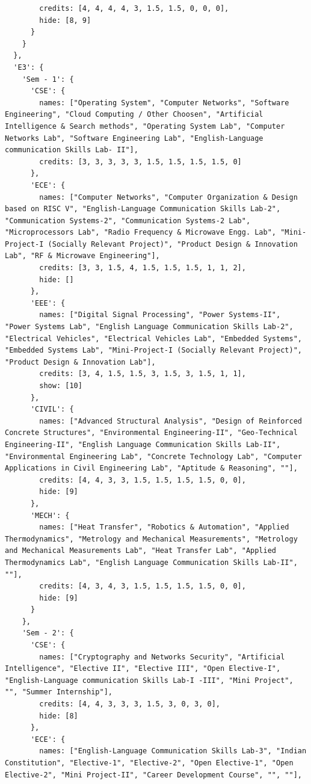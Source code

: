 \documentclass[11pt,a4paper,oneside]{article}
\begin{document}
\begin{lstlisting}
        credits: [4, 4, 4, 4, 3, 1.5, 1.5, 0, 0, 0],
        hide: [8, 9]
      }
    }
  },
  'E3': {
    'Sem - 1': {
      'CSE': {
        names: ["Operating System", "Computer Networks", "Software Engineering", "Cloud Computing / Other Choosen", "Artificial Intelligence & Search methods", "Operating System Lab", "Computer Networks Lab", "Software Engineering Lab", "English-Language communication Skills Lab- II"],
        credits: [3, 3, 3, 3, 3, 1.5, 1.5, 1.5, 1.5, 0]
      },
      'ECE': {
        names: ["Computer Networks", "Computer Organization & Design based on RISC V", "English-Language Communication Skills Lab-2", "Communication Systems-2", "Communication Systems-2 Lab", "Microprocessors Lab", "Radio Frequency & Microwave Engg. Lab", "Mini-Project-I (Socially Relevant Project)", "Product Design & Innovation Lab", "RF & Microwave Engineering"],
        credits: [3, 3, 1.5, 4, 1.5, 1.5, 1.5, 1, 1, 2],
        hide: []
      },
      'EEE': {
        names: ["Digital Signal Processing", "Power Systems-II", "Power Systems Lab", "English Language Communication Skills Lab-2", "Electrical Vehicles", "Electrical Vehicles Lab", "Embedded Systems", "Embedded Systems Lab", "Mini-Project-I (Socially Relevant Project)", "Product Design & Innovation Lab"],
        credits: [3, 4, 1.5, 1.5, 3, 1.5, 3, 1.5, 1, 1],
        show: [10]
      },
      'CIVIL': {
        names: ["Advanced Structural Analysis", "Design of Reinforced Concrete Structures", "Environmental Engineering-II", "Geo-Technical Engineering-II", "English Language Communication Skills Lab-II", "Environmental Engineering Lab", "Concrete Technology Lab", "Computer Applications in Civil Engineering Lab", "Aptitude & Reasoning", ""],
        credits: [4, 4, 3, 3, 1.5, 1.5, 1.5, 1.5, 0, 0],
        hide: [9]
      },
      'MECH': {
        names: ["Heat Transfer", "Robotics & Automation", "Applied Thermodynamics", "Metrology and Mechanical Measurements", "Metrology and Mechanical Measurements Lab", "Heat Transfer Lab", "Applied Thermodynamics Lab", "English Language Communication Skills Lab-II", ""],
        credits: [4, 3, 4, 3, 1.5, 1.5, 1.5, 1.5, 0, 0],
        hide: [9]
      }
    },
    'Sem - 2': {
      'CSE': {
        names: ["Cryptography and Networks Security", "Artificial Intelligence", "Elective II", "Elective III", "Open Elective-I", "English-Language communication Skills Lab-I -III", "Mini Project", "", "Summer Internship"],
        credits: [4, 4, 3, 3, 3, 1.5, 3, 0, 3, 0],
        hide: [8]
      },
      'ECE': {
        names: ["English-Language Communication Skills Lab-3", "Indian Constitution", "Elective-1", "Elective-2", "Open Elective-1", "Open Elective-2", "Mini Project-II", "Career Development Course", "", ""],

\end{lstlisting}
\end{document}
